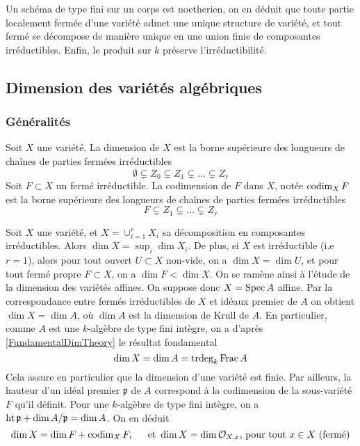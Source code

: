 Un schéma de type fini sur un corps est noetherien, on en déduit que toute partie localement fermée d'une variété admet une unique structure de variété, et tout fermé se décompose de manière unique en une union finie de composantes irréductibles. Enfin, le produit sur $k$ préserve l'irréductibilité.

\subsection{Dimension des variétés algébriques}

\subsubsection{Généralités}

\begin{defn}
Soit $X$ une variété. La dimension de $X$ est la borne supérieure des longueurs de chaînes de parties fermées irréductibles
$$\emptyset \varsubsetneq Z_0 \varsubsetneq Z_1 \varsubsetneq ... \varsubsetneq Z_r$$
Soit $F\subset X$ un fermé irréductible. La codimension de $F$ dans $X$, notée $\operatorname{codim}_X F$ est la borne supérieure des longueurs de chaînes de parties fermées irréductibles
$$F \varsubsetneq Z_1 \varsubsetneq ... \varsubsetneq Z_r$$
\end{defn}

Soit $X$ une variété, et $X=\cup_{i=1}^rX_i$ sa décomposition en composantes irréductibles. Alors $\dim X=\sup_i \dim X_i$. De plus, si $X$ est irréductible (i.e $r=1$), alors pour tout ouvert $U\subset X$ non-vide, on a $\dim X=\dim U$, et pour tout fermé propre $F\subset X$, on a $\dim F<\dim X$. On se ramène ainsi à l'étude de la dimension des variétés affines. On suppose donc $X=\operatorname{Spec} A$ affine. Par la correspondance entre fermés irréductibles de $X$ et idéaux premier de $A$ on obtient $\dim X= \dim A$, où $\dim A$ est la dimension de Krull de $A$. En particulier, comme $A$ est une $k$-algèbre de type fini intègre, on a d'après \ref{FundamentalDimTheory} le résultat fondamental
$$\dim X=\dim A=\operatorname{trdeg}_k \operatorname{Frac} A$$
Cela assure en particulier que la dimension d'une variété est finie. Par ailleurs, la hauteur d'un idéal premier $\mathfrak{p}$ de $A$ correspond à la codimension de la sous-variété $F$ qu'il définit. Pour une $k$-algèbre de type fini intègre, on a $\operatorname{ht} \mathfrak{p}+ \dim A/\mathfrak{p}=\dim A$. On en déduit
$$\dim X=\dim F+\operatorname{codim}_X F,\,\,\,\,\,\,\, \text{ et } \dim X=\dim\mathcal{O}_{X,x} \text{, pour tout } x\in X \text{ (fermé)}$$

